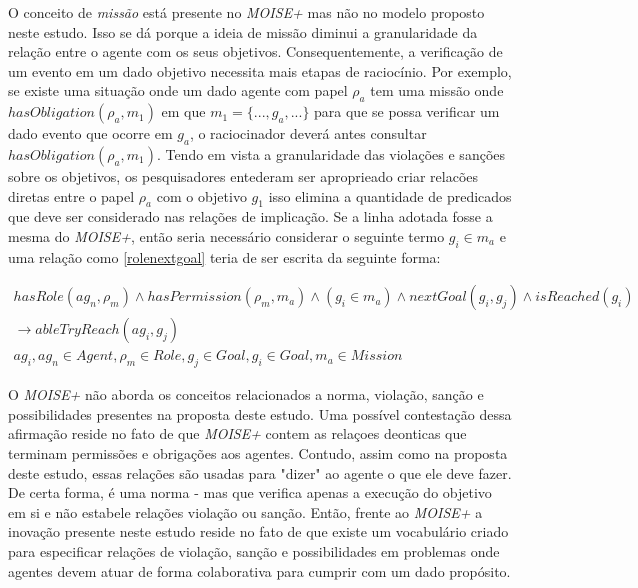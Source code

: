 O conceito de \textit{missão} está presente no \textit{MOISE+} mas não no modelo proposto neste estudo. Isso se dá porque a ideia de missão diminui 
a granularidade da relação entre o agente com os seus objetivos. Consequentemente, a verificação de um evento em um dado objetivo necessita mais etapas 
de raciocínio. Por exemplo, se existe uma situação onde um dado agente com papel $\rho_a$ tem uma missão onde $ hasObligation(\rho_a,m_1) $ em que 
$ m_1 = \{ ... , g_a, ...\}$ para que se possa verificar um dado evento que ocorre em $ g_a $, o raciocinador deverá antes consultar $ hasObligation(\rho_a,m
_1) $. Tendo em vista a granularidade das violações e sanções sobre os objetivos, os pesquisadores entederam ser aproprieado criar relacões diretas 
entre o papel $ \rho_a $ com o objetivo $g_1 $ isso elimina a quantidade de predicados que deve ser considerado nas relações de implicação. Se a linha 
adotada fosse a mesma do \textit{MOISE+}, então seria necessário considerar o seguinte termo $ g_i \in m_a $ e uma relação como \ref{rolenextgoal} 
teria de ser escrita da seguinte forma: 

\begin{eqnarray}\label{constmoise01}
	hasRole(ag_n,\rho_m) \wedge hasPermission(\rho_m,m_a) \wedge (g_i \in m_a) \wedge nextGoal(g_i,g_j) \wedge isReached(g_i) \nonumber \\
	\to ableTryReach(ag_i,g_j) \nonumber \\
    ag_i, ag_n \in Agent, \rho_m \in Role, g_j \in Goal, g_i \in Goal, m_a \in Mission
\end{eqnarray}

O \textit{MOISE+} não aborda os conceitos relacionados a norma, violação, sanção e possibilidades presentes na proposta deste estudo. Uma possível 
contestação dessa afirmação reside no fato de que \textit{MOISE+} contem as relaçoes deonticas que terminam permissões e obrigações aos agentes. Contudo,  
assim como na proposta deste estudo, essas relações são usadas para "dizer" ao agente o que ele deve fazer. De certa forma, é uma norma - mas que 
verifica apenas a execução do objetivo em si e não estabele relações violação ou sanção. Então, frente ao \textit{MOISE+} a inovação presente 
neste estudo reside no fato de que existe um vocabulário criado para especificar relações de violação, sanção e possibilidades em problemas 
onde agentes devem atuar de forma colaborativa para cumprir com um dado propósito. 

